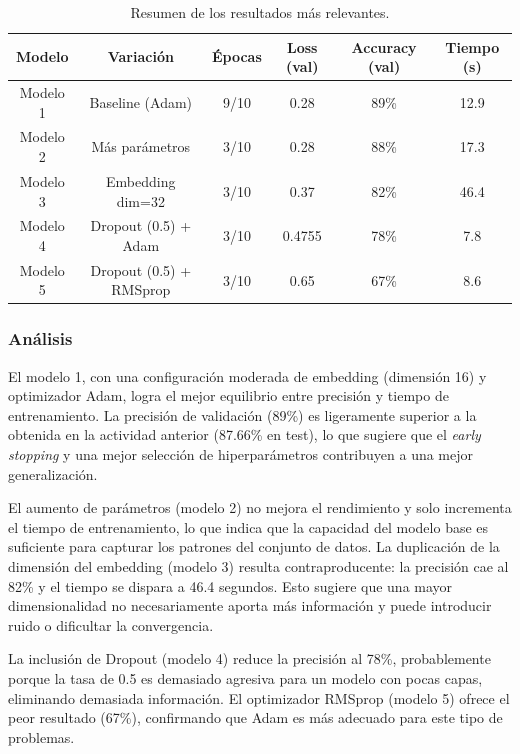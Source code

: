 \documentclass[12pt]{article}
\begin{document}
\begin{table}[htbp]
\centering
\caption{Resumen de los resultados más relevantes.}
\label{tab:resumen_yelp_opt}
\begin{tabular}{c c c c c c}
\toprule
\textbf{Modelo} & \textbf{Variación} & \textbf{Épocas} & \textbf{Loss (val)} & \textbf{Accuracy (val)} & \textbf{Tiempo (s)} \\
\midrule
Modelo 1 & Baseline (Adam) & 9/10 & 0.28 & 89\% & 12.9 \\
Modelo 2 & Más parámetros & 3/10 & 0.28 & 88\% & 17.3 \\
Modelo 3 & Embedding dim=32 & 3/10 & 0.37 & 82\% & 46.4 \\
Modelo 4 & Dropout (0.5) + Adam & 3/10 & 0.4755 & 78\% & 7.8 \\
Modelo 5 & Dropout (0.5) + RMSprop & 3/10 & 0.65 & 67\% & 8.6 \\
\bottomrule
\end{tabular}
\end{table}

\subsubsection*{Análisis}

El modelo 1, con una configuración moderada de embedding (dimensión 16) y optimizador Adam, logra el mejor equilibrio entre precisión y tiempo de entrenamiento. La precisión de validación (89\%) es ligeramente superior a la obtenida en la actividad anterior (87.66\% en test), lo que sugiere que el \textit{early stopping} y una mejor selección de hiperparámetros contribuyen a una mejor generalización.

El aumento de parámetros (modelo 2) no mejora el rendimiento y solo incrementa el tiempo de entrenamiento, lo que indica que la capacidad del modelo base es suficiente para capturar los patrones del conjunto de datos. La duplicación de la dimensión del embedding (modelo 3) resulta contraproducente: la precisión cae al 82\% y el tiempo se dispara a 46.4 segundos. Esto sugiere que una mayor dimensionalidad no necesariamente aporta más información y puede introducir ruido o dificultar la convergencia.

La inclusión de Dropout (modelo 4) reduce la precisión al 78\%, probablemente porque la tasa de 0.5 es demasiado agresiva para un modelo con pocas capas, eliminando demasiada información. El optimizador RMSprop (modelo 5) ofrece el peor resultado (67\%), confirmando que Adam es más adecuado para este tipo de problemas.
\end{document}
